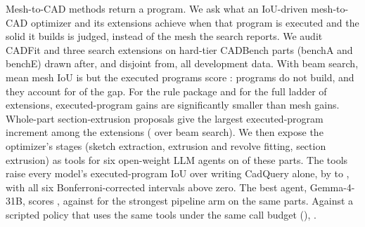 Mesh-to-CAD methods return a program. We ask what an IoU-driven mesh-to-CAD optimizer and its extensions achieve when that program is executed and the solid it builds is judged, instead of the mesh the search reports. We audit CADFit and three search extensions on \nFresh{} hard-tier CADBench parts (benchA and benchE) drawn after, and disjoint from, all development data. With beam search, mean mesh IoU is \armBeamIou{} but the executed programs score \armBeamCad{}: \armBeamUnbuilt{} programs do not build, and they account for \armBeamGapUnbuilt{} of the \armBeamGap{} gap. For the rule package and for the full ladder of extensions, executed-program gains are significantly smaller than mesh gains. Whole-part section-extrusion proposals give the largest executed-program increment among the extensions (\dSecBeamCadDiff{} over beam search). We then expose the optimizer's stages (sketch extraction, extrusion and revolve fitting, section extrusion) as tools for six open-weight LLM agents on \nAgentParts{} of these parts. The tools raise every model's executed-program IoU over writing CadQuery alone, by \skillsGainMin{} to \skillsGainMax{}, with all six Bonferroni-corrected intervals above zero. The best agent, Gemma-4-31B, scores \mGemmaSkills, against \agentPipeSec{} for the strongest pipeline arm on the same parts. Against a scripted policy that uses the same tools under the same call budget (\policyMatchedCad), \policyVerdict.
